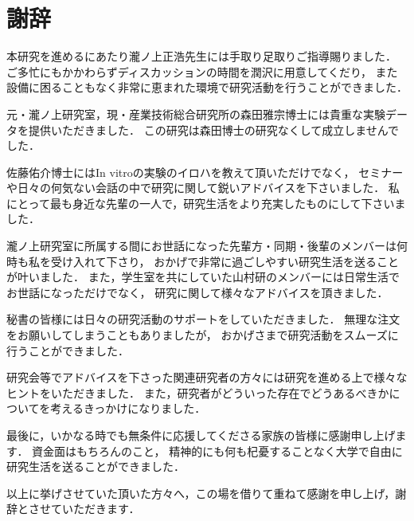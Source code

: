 \chapter*{謝辞}

本研究を進めるにあたり瀧ノ上正浩先生には手取り足取りご指導賜りました．
ご多忙にもかかわらずディスカッションの時間を潤沢に用意してくだり，
また設備に困ることもなく非常に恵まれた環境で研究活動を行うことができました．

元・瀧ノ上研究室，現・産業技術総合研究所の森田雅宗博士には貴重な実験データを提供いただきました．
この研究は森田博士の研究なくして成立しませんでした．

佐藤佑介博士にはIn vitroの実験のイロハを教えて頂いただけでなく，
セミナーや日々の何気ない会話の中で研究に関して鋭いアドバイスを下さいました．
私にとって最も身近な先輩の一人で，研究生活をより充実したものにして下さいました．

瀧ノ上研究室に所属する間にお世話になった先輩方・同期・後輩のメンバーは何時も私を受け入れて下さり，
おかげで非常に過ごしやすい研究生活を送ることが叶いました．
また，学生室を共にしていた山村研のメンバーには日常生活でお世話になっただけでなく，
研究に関して様々なアドバイスを頂きました．

秘書の皆様には日々の研究活動のサポートをしていただきました．
無理な注文をお願いしてしまうこともありましたが，
おかげさまで研究活動をスムーズに行うことができました．

研究会等でアドバイスを下さった関連研究者の方々には研究を進める上で様々なヒントをいただきました．
また，研究者がどういった存在でどうあるべきかについてを考えるきっかけになりました．

最後に，いかなる時でも無条件に応援してくださる家族の皆様に感謝申し上げます．
資金面はもちろんのこと，
精神的にも何も杞憂することなく大学で自由に研究生活を送ることができました．

以上に挙げさせていた頂いた方々へ，この場を借りて重ねて感謝を申し上げ，謝辞とさせていただきます．
